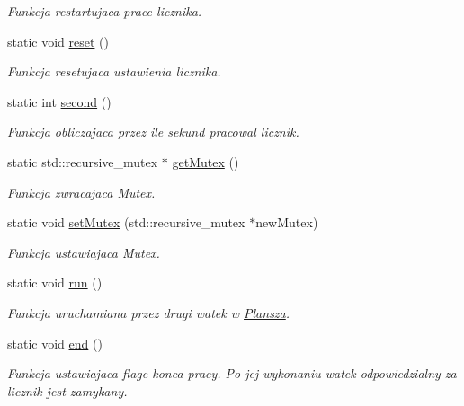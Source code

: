\begin{DoxyCompactItemize}
\begin{DoxyCompactList}\small\item\em Funkcja restartujaca prace licznika. \end{DoxyCompactList}\item 
\hypertarget{class_timer_a9020542d73357a4eef512eefaf57524b}{}static void \hyperlink{class_timer_a9020542d73357a4eef512eefaf57524b}{reset} ()\label{class_timer_a9020542d73357a4eef512eefaf57524b}

\begin{DoxyCompactList}\small\item\em Funkcja resetujaca ustawienia licznika. \end{DoxyCompactList}\item 
static int \hyperlink{class_timer_a2e2f6c73ec2eefe72042f3c52a632806}{second} ()
\begin{DoxyCompactList}\small\item\em Funkcja obliczajaca przez ile sekund pracowal licznik. \end{DoxyCompactList}\item 
static std\+::recursive\+\_\+mutex $\ast$ \hyperlink{class_timer_a6998144d90d80227e9dd7451556f5ff6}{get\+Mutex} ()
\begin{DoxyCompactList}\small\item\em Funkcja zwracajaca Mutex. \end{DoxyCompactList}\item 
static void \hyperlink{class_timer_a963623dd91d8379685d31add61ae54af}{set\+Mutex} (std\+::recursive\+\_\+mutex $\ast$new\+Mutex)
\begin{DoxyCompactList}\small\item\em Funkcja ustawiajaca Mutex. \end{DoxyCompactList}\item 
\hypertarget{class_timer_a1323444ebd7f2c1407518a03a193b5f4}{}static void \hyperlink{class_timer_a1323444ebd7f2c1407518a03a193b5f4}{run} ()\label{class_timer_a1323444ebd7f2c1407518a03a193b5f4}

\begin{DoxyCompactList}\small\item\em Funkcja uruchamiana przez drugi watek w \hyperlink{class_plansza}{Plansza}. \end{DoxyCompactList}\item 
\hypertarget{class_timer_af8c9d9213ff483fb73c82132c9b097ff}{}static void \hyperlink{class_timer_af8c9d9213ff483fb73c82132c9b097ff}{end} ()\label{class_timer_af8c9d9213ff483fb73c82132c9b097ff}

\begin{DoxyCompactList}\small\item\em Funkcja ustawiajaca flage konca pracy. Po jej wykonaniu watek odpowiedzialny za licznik jest zamykany. \end{DoxyCompactList}\end{DoxyCompactItemize}


